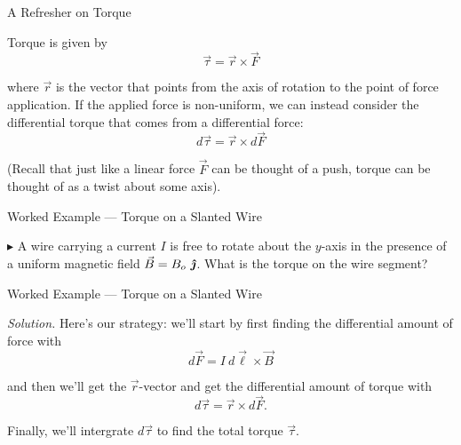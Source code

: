 \documentclass{beamer}
\begin{document}
\begin{frame}{A Refresher on Torque}

Torque is given by
\begin{equation*}
    \vec{\tau} = \vec{r} \times \vec{F}
\end{equation*}

where $\vec{r}$ is the vector that points from the axis of rotation to the point of force application. If the applied force is non-uniform, we can instead consider the differential torque that comes from a differential force:
\begin{equation*}
    d\vec{\tau} = \vec{r} \times d\vec{F}
\end{equation*}

(Recall that just like a linear force $\vec{F}$ can be thought of a push, torque can be thought of as a twist about some axis).

\end{frame}

\begin{frame}{Worked Example --- Torque on a Slanted Wire}

$\blacktriangleright$ A wire carrying a current $I$ is free to rotate about the $y$-axis in the presence of a uniform magnetic field $\vec{B} = B_o\ \bm{\hat{\jmath}}$. What is the torque on the wire segment?

\begin{figure}[H]
\centering
{}
\end{figure}

\end{frame}

\begin{frame}{Worked Example --- Torque on a Slanted Wire}

\textit{Solution.} Here's our strategy: we'll start by first finding the differential amount of force with
\begin{equation*}
    d\vec{F} = I\ d\vec{\ell} \times \vec{B}
\end{equation*}

and then we'll get the $\vec{r}$-vector and get the differential amount of torque with
\begin{equation*}
    d\vec{\tau} = \vec{r} \times d\vec{F}.
\end{equation*}

Finally, we'll intergrate $d\vec{\tau}$ to find the total torque $\vec{\tau}$.

\end{frame}
\end{document}
